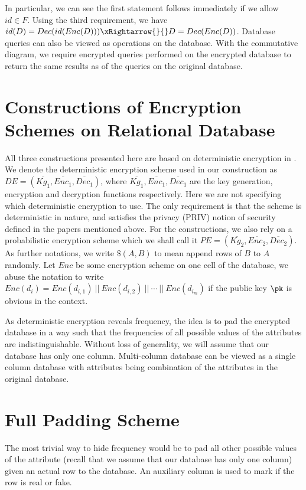 In particular, we can see the first statement follows immediately if we allow $id \in F$. Using the third requirement, we have $id(D) = Dec(id(Enc(D))) \xRightarrow{}{} D = Dec(Enc(D))$. Database queries can also be viewed as operations on the database. With the commutative diagram, we require encrypted queries performed on the encrypted database to return the same results as of the queries on the original database. 




\section{Constructions of Encryption Schemes on Relational Database}
All three constructions presented here are based on deterministic encryption in \cite{Bellare2007, Bellare2008, Boldyreva2008}. We denote the deterministic encryption scheme used in our construction as $DE = (\overbar{Kg_1}, \overbar{Enc_1}, \overbar{Dec_1})$, where $\overbar{Kg_1}, \overbar{Enc_1}, \overbar{Dec_1}$ are the key generation, encryption and decryption functions respectively. Here we are not specifying which deterministic encryption to use. The only requirement is that the scheme is deterministic in nature, and satisfies the privacy (PRIV) notion of security defined in the papers mentioned above. For the constructions, we also rely on a probabilistic encryption scheme which we shall call it $PE = (\overbar{Kg_2}, \overbar{Enc_2}, \overbar{Dec_2})$. As further notations, we write $\$(A, B)$ to mean append rows of $B$ to $A$ randomly. Let $Enc$ be some encryption scheme on one cell of the database, we abuse the notation to write $Enc(d_i) = Enc(d_{i,1}) \ || \ Enc(d_{i,2}) \ || \ \cdots \ || \ Enc(d_{i_m})$ if the public key $\pk$ is obvious in the context.

As deterministic encryption reveals frequency, the idea is to pad the encrypted database in a way such that the frequencies of all possible values of the attributes are indistinguishable. Without loss of generality, we will assume that our database has only one column. Multi-column database can be viewed as a single column database with attributes being combination of the attributes in the original database.





\section{Full Padding Scheme}
The most trivial way to hide frequency would be to pad all other possible values of the attribute (recall that we assume that our database has only one column) given an actual row to the database. An auxiliary column is used to mark if the row is real or fake.

